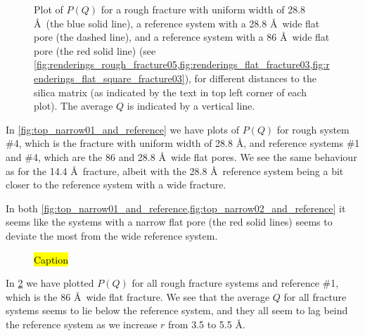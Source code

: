 %
\begin{figure}[!p]%
    \centering%
    {%
        \captionsetup{width=\textwidth}%
        \caption{%
            Plot of $P(Q)$ for a rough fracture with uniform width of 28.8 \AA\ (the blue solid line), a reference system with a 28.8 \AA\ wide flat pore (the dashed line), and a reference system with a 86 \AA\ wide flat pore (the red solid line) (see \cref{fig:renderings_rough_fracture05,fig:renderings_flat_fracture03,fig:renderings_flat_square_fracture03}), for different distances to the silica matrix (as indicated by the text in top left corner of each plot). The average $Q$ is indicated by a vertical line. %
            \label{fig:top_narrow02_and_reference}%
        }%
    }%
\end{figure}%

In \cref{fig:top_narrow01_and_reference} we have plots of $P(Q)$ for rough system \#4, which is the fracture with uniform width of 28.8 \AA, and reference systems \#1 and \#4, which are the 86 and 28.8 \AA\ wide flat pores. We see the same behaviour as for the 14.4 \AA\ fracture, albeit with the 28.8 \AA\ reference system being a bit closer to the reference system with a wide fracture.

In both \cref{fig:top_narrow01_and_reference,fig:top_narrow02_and_reference} it seems like the systems with a narrow flat pore (the red solid lines) seems to deviate the most from the wide reference system.

%
\begin{figure}[htpb]%
    \centering%
    {%
        \caption{%
            \hl{Caption} %
            \label{fig:top_all_rough_and_one_reference}%
        }%
    }%
\end{figure}%

In \cref{fig:top_all_rough_and_one_reference} we have plotted $P(Q)$ for all rough fracture systems and reference \#1, which is the 86 \AA\ wide flat fracture. We see that the average $Q$ for all fracture systems seems to lie below the reference system, and they all seem to lag beind the reference system as we increase $r$ from 3.5 to 5.5 \AA.